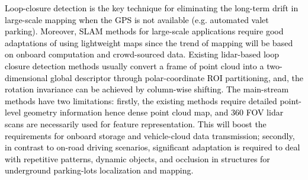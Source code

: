 \documentclass[letterpaper, 10 pt, conference]{ieeeconf}   %
\newcommand\kevin[1]{\textcolor{black}{#1}}
\begin{document}

\kevin{Loop-closure detection is the key technique for eliminating the long-term drift in large-scale mapping when the GPS is not available (e.g. automated valet parking). Moreover, SLAM methods for large-scale applications require good adaptations of using lightweight maps since the trend of mapping will be based on onboard computation and crowd-sourced data. Existing lidar-based loop closure detection methods\cite{kim2018scan, wang2020lidar, li2021ssc, wang2020intensity} usually convert a frame of point cloud into a two-dimensional global descriptor through polar-coordinate ROI partitioning, and, the rotation invariance can be achieved by column-wise shifting. The main-stream methods have two limitations: firstly, the existing methods require detailed point-level geometry information hence dense point cloud map, and 360 FOV lidar scans are necessarily used for feature representation. This will boost the requirements for onboard storage and vehicle-cloud data transmission; secondly, in contrast to on-road driving scenarios, significant adaptation is required to deal with repetitive patterns, dynamic objects, and occlusion in structures for underground parking-lots localization and mapping.}
\end{document}
